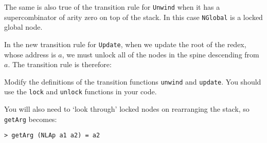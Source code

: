 \pgmrule%
{}%
{}
\label{pgm:rule:2unwind}
The same is also true of the transition rule for \mbox{\tt Unwind} when it has
a supercombinator of arity zero on top of the stack. In this case
\mbox{\tt *NGlobal} is a locked global node.

\pgmrule%
{}%
{}

In the new transition rule for \mbox{\tt Update}, when we update the root of
the redex, whose address is $a$, we must unlock all of the nodes in the
spine descending from $a$. The transition rule is therefore:

\pgmrule%
{}%
{}

\begin{exercise}\label{pgm:X:instructions2}
Modify the definitions of the transition functions \mbox{\tt unwind} and
\mbox{\tt update}. You should use the \mbox{\tt lock} and \mbox{\tt unlock} functions in your
code.

You will also need to `look through' locked nodes on rearranging the
stack, so \mbox{\tt getArg} becomes:
\begin{verbatim}
> getArg (NLAp a1 a2) = a2
\end{verbatim}
%
\end{exercise}

